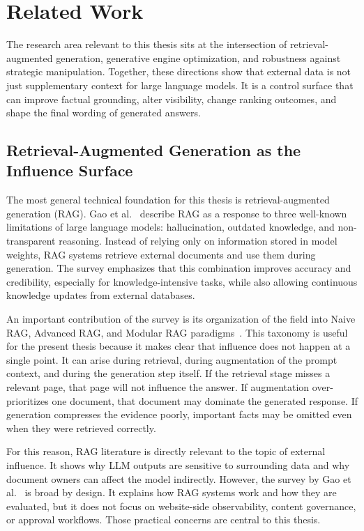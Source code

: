 
\chapter{Related Work}\label{chapter:related_work}

The research area relevant to this thesis sits at the intersection of retrieval-augmented
generation, generative engine optimization, and robustness against strategic manipulation.
Together, these directions show that external data is not just supplementary context for large
language models. It is a control surface that can improve factual grounding, alter visibility,
change ranking outcomes, and shape the final wording of generated answers.

\section{Retrieval-Augmented Generation as the Influence Surface}

The most general technical foundation for this thesis is retrieval-augmented generation
(RAG). Gao et al.~\cite{gao2024ragsurvey} describe RAG as a response to three well-known
limitations of large language models: hallucination, outdated knowledge, and non-transparent
reasoning. Instead of relying only on information stored in model weights, RAG systems
retrieve external documents and use them during generation. The survey emphasizes that this
combination improves accuracy and credibility, especially for knowledge-intensive tasks, while
also allowing continuous knowledge updates from external databases.

An important contribution of the survey is its organization of the field into Naive RAG,
Advanced RAG, and Modular RAG paradigms~\cite{gao2024ragsurvey}. This taxonomy is
useful for the present thesis because it makes clear that influence does not happen at a single
point. It can arise during retrieval, during augmentation of the prompt context, and during the
generation step itself. If the retrieval stage misses a relevant page, that page will not influence
the answer. If augmentation over-prioritizes one document, that document may dominate the
generated response. If generation compresses the evidence poorly, important facts may be
omitted even when they were retrieved correctly.

For this reason, RAG literature is directly relevant to the topic of external influence. It shows
why LLM outputs are sensitive to surrounding data and why document owners can affect the
model indirectly. However, the survey by Gao et al.~\cite{gao2024ragsurvey} is broad by
design. It explains how RAG systems work and how they are evaluated, but it does not focus
on website-side observability, content governance, or approval workflows. Those practical
concerns are central to this thesis.

